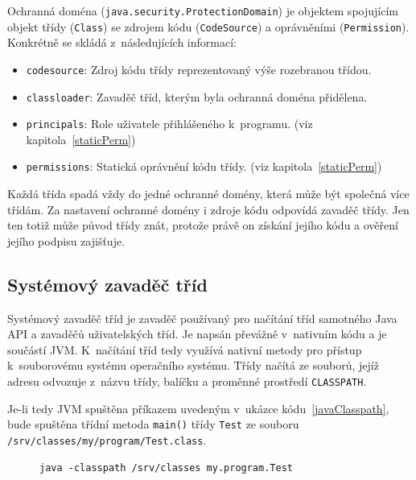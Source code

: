 Ochranná doména ({\tt java.security.ProtectionDomain}) je objektem spojujícím objekt třídy ({\tt Class}) se zdrojem kódu ({\tt CodeSource}) a oprávněními ({\tt Permission}). Konkrétně se skládá z~následujících informací:~\cite{sourceProtectionDomain}

\begin{itemize}
  \item {\tt codesource}: Zdroj kódu třídy reprezentovaný výše rozebranou třídou.
  \item {\tt classloader}: Zavaděč tříd, kterým byla ochranná doména přidělena.
  \item {\tt principals}: Role uživatele přihlášeného k~programu. (viz kapitola~\ref{staticPerm})
  \item {\tt permissions}: Statická oprávnění kódu třídy. (viz kapitola~\ref{staticPerm})
\end{itemize}

Každá třída spadá vždy do jedné ochranné domény, která může být společná více třídám. Za nastavení ochranné domény i zdroje kódu odpovídá zavaděč třídy.
Jen ten totiž může původ třídy znát, protože právě on získání jejího kódu a ověření jejího podpisu zajišťuje.

\subsection{Systémový zavaděč tříd} \label{interniZavadec}

Systémový zavaděč tříd je zavaděč používaný pro načítání tříd samotného Java API a zavaděčů uživatelských tříd.
Je napsán převážně v~nativním kódu a je součástí JVM. K~načítání tříd tedy využívá nativní metody pro přístup k~souborovému systému operačního systému.
Třídy načítá ze souborů, jejíž adresu odvozuje z~názvu třídy, balíčku a proměnné prostředí {\tt CLASSPATH}.~\cite{oaks}

Je-li tedy JVM spuštěna příkazem uvedeným v~ukázce kódu~\ref{javaClasspath}, bude spuštěna třídní metoda {\tt main()} třídy {\tt Test}
ze souboru {\tt /srv/classes/my/program/Test.class}.

\begin{figure}[tbh]
\begin{lstlisting}[caption=Spuštění JVM s~hodnotou proměnné {\tt CLASSPATH} rovnou {\tt /srv/classes}, label=javaClasspath]
java -classpath /srv/classes my.program.Test
\end{lstlisting}
\end{figure}

